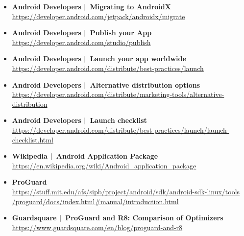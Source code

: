 \documentclass[a4paper]{article}
\begin{document}
{\begin{itemize}
		\item \textbf{Android Developers | Migrating to AndroidX}\\
		\href{https://developer.android.com/jetpack/androidx/migrate}
		{https://developer.android.com/jetpack/androidx/migrate}
		
		\item \textbf{Android Developers | Publish your App}\\
		\href{https://developer.android.com/studio/publish}
		{https://developer.android.com/studio/publish}
		
		\item \textbf{Android Developers | Launch your app worldwide}\\
		\href{https://developer.android.com/distribute/best-practices/launch}
		{https://developer.android.com/distribute/best-practices/launch}
		
		\item \textbf{Android Developers | Alternative distribution options}\\
		\href{https://developer.android.com/distribute/marketing-tools/alternative-distribution}
		{https://developer.android.com/distribute/marketing-tools/alternative-distribution}
		
		\item \textbf{Android Developers | Launch checklist}\\
		\href{https://developer.android.com/distribute/best-practices/launch/launch-checklist.html}
		{https://developer.android.com/distribute/best-practices/launch/launch-checklist.html}
		
		\item \textbf{Wikipedia | Android Application Package}\\
		\href{https://en.wikipedia.org/wiki/Android_application_package}
		{https://en.wikipedia.org/wiki/Android\_application\_package}
		
		\item \textbf{ProGuard}\\
		\href{https://stuff.mit.edu/afs/sipb/project/android/sdk/android-sdk-linux/tools/proguard/docs/index.html#manual/introduction.html}
		{https://stuff.mit.edu/afs/sipb/project/android/sdk/android-sdk-linux/tools\\ \quad /proguard/docs/index.html\#manual/introduction.html}
		
		\item \textbf{Guardsquare | ProGuard and R8: Comparison of Optimizers}\\
		\href{https://www.guardsquare.com/en/blog/proguard-and-r8}
		{https://www.guardsquare.com/en/blog/proguard-and-r8}
		

\end{itemize}}
\end{document}
